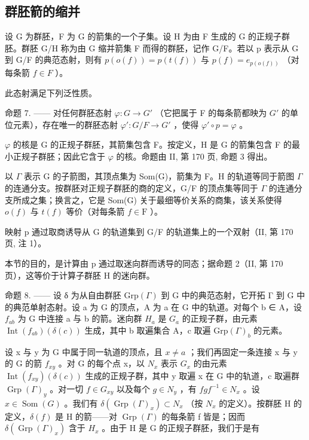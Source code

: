 \subsection{群胚箭的缩并}

设 G 为群胚，F 为 G 的箭集的一个子集。设 H 为由 F 生成的 G 的正规子群胚。群胚 G/H 称为由 G 缩并箭集 F 而得的群胚，记作 G/F。若以 p 表示从 G 到 G/F 的典范态射，则有 \(p(o(f)) = p(t(f))\) 与 \(p(f) = e_{p(o(f))}\) （对每条箭 \(f \in F\) ）。

此态射满足下列泛性质。

命题 7. —— 对任何群胚态射 \(\varphi\colon G\to G'\) （它把属于 F 的每条箭都映为 \(G'\) 的单位元素），存在唯一的群胚态射 \(\varphi'\colon G/F\to G'\) ，使得 \(\varphi'\circ p=\varphi\) 。

\(\varphi\) 的核是 G 的正规子群胚，其箭集包含 F。按定义，H 是 G 的箭集包含 F 的最小正规子群胚；因此它含于 \(\varphi\) 的核。命题由 II, 第 170 页, 命题 3 得出。

以 \(\Gamma\) 表示 G 的子箭图，其顶点集为 Som(G)，箭集为 F。H 的轨道等同于箭图 \(\Gamma\) 的连通分支。按群胚对正规子群胚的商的定义，G/F 的顶点集等同于 \(\Gamma\) 的连通分支所成之集；换言之，它是 Som(G) 关于最细等价关系的商集，该关系使得 \(o(f)\) 与 \(t(f)\) 等价（对每条箭 \(f \in \mathrm{F}\) ）。

映射 p 通过取商诱导从 G 的轨道集到 G/F 的轨道集上的一个双射（II, 第 170 页, 注 1）。

本节的目的，是计算由 p 通过取迷向群而诱导的同态；据命题 2（II, 第 170 页），这等价于计算子群胚 H 的迷向群。

命题 8. —— 设 δ 为从自由群胚 \(\mathrm{Grp}(\Gamma)\) 到 G 中的典范态射，它开拓 Γ 到 G 中的典范单射态射。设 a 为 G 的顶点，A 为 a 在 G 中的轨道。对每个 b ∈ A，设 \(f_{ab}\) 为 G 中连接 a 与 b 的箭。迷向群 \(H_{a}\) 是 \(G_{a}\) 的正规子群，由元素 \(\operatorname{Int}(f_{ab})(\delta(c))\) 生成，其中 b 取遍集合 A，c 取遍 \(\mathrm{Grp}(\Gamma)_{b}\) 的元素。

设 x 与 y 为 G 中属于同一轨道的顶点，且 \(x \neq a\) ；我们再固定一条连接 x 与 y 的 G 的箭 \(f_{xy}\) 。对 G 的每个点 x，以 \(N_{x}\) 表示 \(G_{x}\) 的由元素 \(\operatorname{Int}(f_{xy})(\delta(c))\) 生成的正规子群，其中 y 取遍 x 在 G 中的轨道，c 取遍群 \(\operatorname{Grp}(\Gamma)_{y}\) 。对一切 \(f \in G_{xy}\) 以及每个 \(g \in N_{y}\) ，有 \(fgf^{-1} \in N_{x}\) 。设 \(x \in \operatorname{Som}(G)\) 。我们有 \(\delta(\operatorname{Grp}(\Gamma)_{x}) \subset N_{x}\) （按 \(N_{x}\) 的定义）。按群胚 H 的定义，\(\delta(f)\) 是 H 的箭——对 \(\operatorname{Grp}(\Gamma)\) 的每条箭 f 皆是；因而 \(\delta(\operatorname{Grp}(\Gamma)_{x})\) 含于 \(H_{x}\) 。由于 H 是 G 的正规子群胚，我们于是有

